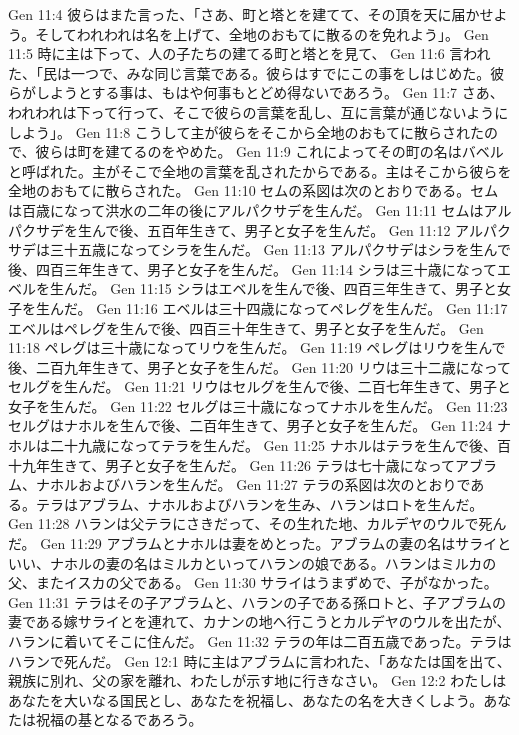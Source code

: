 Gen 11:4  彼らはまた言った、「さあ、町と塔とを建てて、その頂を天に届かせよう。そしてわれわれは名を上げて、全地のおもてに散るのを免れよう」。
Gen 11:5  時に主は下って、人の子たちの建てる町と塔とを見て、
Gen 11:6  言われた、「民は一つで、みな同じ言葉である。彼らはすでにこの事をしはじめた。彼らがしようとする事は、もはや何事もとどめ得ないであろう。
Gen 11:7  さあ、われわれは下って行って、そこで彼らの言葉を乱し、互に言葉が通じないようにしよう」。
Gen 11:8  こうして主が彼らをそこから全地のおもてに散らされたので、彼らは町を建てるのをやめた。
Gen 11:9  これによってその町の名はバベルと呼ばれた。主がそこで全地の言葉を乱されたからである。主はそこから彼らを全地のおもてに散らされた。
Gen 11:10  セムの系図は次のとおりである。セムは百歳になって洪水の二年の後にアルパクサデを生んだ。
Gen 11:11  セムはアルパクサデを生んで後、五百年生きて、男子と女子を生んだ。
Gen 11:12  アルパクサデは三十五歳になってシラを生んだ。
Gen 11:13  アルパクサデはシラを生んで後、四百三年生きて、男子と女子を生んだ。
Gen 11:14  シラは三十歳になってエベルを生んだ。
Gen 11:15  シラはエベルを生んで後、四百三年生きて、男子と女子を生んだ。
Gen 11:16  エベルは三十四歳になってペレグを生んだ。
Gen 11:17  エベルはペレグを生んで後、四百三十年生きて、男子と女子を生んだ。
Gen 11:18  ペレグは三十歳になってリウを生んだ。
Gen 11:19  ペレグはリウを生んで後、二百九年生きて、男子と女子を生んだ。
Gen 11:20  リウは三十二歳になってセルグを生んだ。
Gen 11:21  リウはセルグを生んで後、二百七年生きて、男子と女子を生んだ。
Gen 11:22  セルグは三十歳になってナホルを生んだ。
Gen 11:23  セルグはナホルを生んで後、二百年生きて、男子と女子を生んだ。
Gen 11:24  ナホルは二十九歳になってテラを生んだ。
Gen 11:25  ナホルはテラを生んで後、百十九年生きて、男子と女子を生んだ。
Gen 11:26  テラは七十歳になってアブラム、ナホルおよびハランを生んだ。
Gen 11:27  テラの系図は次のとおりである。テラはアブラム、ナホルおよびハランを生み、ハランはロトを生んだ。
Gen 11:28  ハランは父テラにさきだって、その生れた地、カルデヤのウルで死んだ。
Gen 11:29  アブラムとナホルは妻をめとった。アブラムの妻の名はサライといい、ナホルの妻の名はミルカといってハランの娘である。ハランはミルカの父、またイスカの父である。
Gen 11:30  サライはうまずめで、子がなかった。
Gen 11:31  テラはその子アブラムと、ハランの子である孫ロトと、子アブラムの妻である嫁サライとを連れて、カナンの地へ行こうとカルデヤのウルを出たが、ハランに着いてそこに住んだ。
Gen 11:32  テラの年は二百五歳であった。テラはハランで死んだ。
Gen 12:1  時に主はアブラムに言われた、「あなたは国を出て、親族に別れ、父の家を離れ、わたしが示す地に行きなさい。
Gen 12:2  わたしはあなたを大いなる国民とし、あなたを祝福し、あなたの名を大きくしよう。あなたは祝福の基となるであろう。
